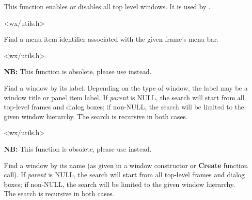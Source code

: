 \label{wxenabletoplevelwindows}


This function enables or disables all top level windows. It is used by
.


<wx/utils.h>


\label{wxfindmenuitemid}


Find a menu item identifier associated with the given frame's menu bar.


<wx/utils.h>


\label{wxfindwindowbylabel}


{\bf NB:} This function is obsolete, please use
 instead.

Find a window by its label. Depending on the type of window, the label may be a window title
or panel item label. If {\it parent} is NULL, the search will start from all top-level
frames and dialog boxes; if non-NULL, the search will be limited to the given window hierarchy.
The search is recursive in both cases.


<wx/utils.h>


\label{wxfindwindowbyname}


{\bf NB:} This function is obsolete, please use
 instead.

Find a window by its name (as given in a window constructor or {\bf Create} function call).
If {\it parent} is NULL, the search will start from all top-level
frames and dialog boxes; if non-NULL, the search will be limited to the given window hierarchy.
The search is recursive in both cases.

